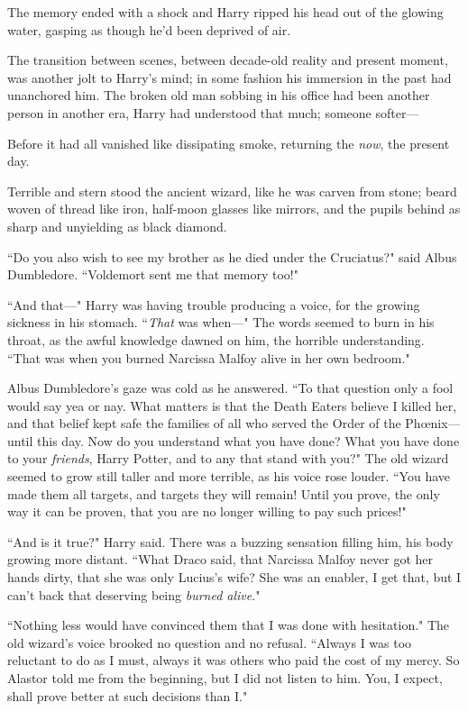 \later

The memory ended with a shock and Harry ripped his head out of the glowing water, gasping as though he'd been deprived of air.

The transition between scenes, between decade-old reality and present moment, was another jolt to Harry's mind; in some fashion his immersion in the past had unanchored him. The broken old man sobbing in his office had been another person in another era, Harry had understood that much; someone softer—

Before it had all vanished like dissipating smoke, returning the \emph{now}, the present day.

Terrible and stern stood the ancient wizard, like he was carven from stone; beard woven of thread like iron, half-moon glasses like mirrors, and the pupils behind as sharp and unyielding as black diamond.

``Do you also wish to see my brother as he died under the Cruciatus?" said Albus Dumbledore. ``Voldemort sent me that memory too!"

``And that—" Harry was having trouble producing a voice, for the growing sickness in his stomach. ``\emph{That} was when—" The words seemed to burn in his throat, as the awful knowledge dawned on him, the horrible understanding. ``That was when you burned Narcissa Malfoy alive in her own bedroom."

Albus Dumbledore's gaze was cold as he answered. ``To that question only a fool would say yea or nay. What matters is that the Death Eaters believe I killed her, and that belief kept safe the families of all who served the Order of the Phœnix—until this day. Now do you understand what you have done? What you have done to your \emph{friends}, Harry Potter, and to any that stand with you?" The old wizard seemed to grow still taller and more terrible, as his voice rose louder. ``You have made them all targets, and targets they will remain! Until you prove, the only way it can be proven, that you are no longer willing to pay such prices!"

``And is it true?" Harry said. There was a buzzing sensation filling him, his body growing more distant. ``What Draco said, that Narcissa Malfoy never got her hands dirty, that she was only Lucius's wife? She was an enabler, I get that, but I can't back that deserving being \emph{burned alive}."

``Nothing less would have convinced them that I was done with hesitation." The old wizard's voice brooked no question and no refusal. ``Always I was too reluctant to do as I must, always it was others who paid the cost of my mercy. So Alastor told me from the beginning, but I did not listen to him. You, I expect, shall prove better at such decisions than I."

